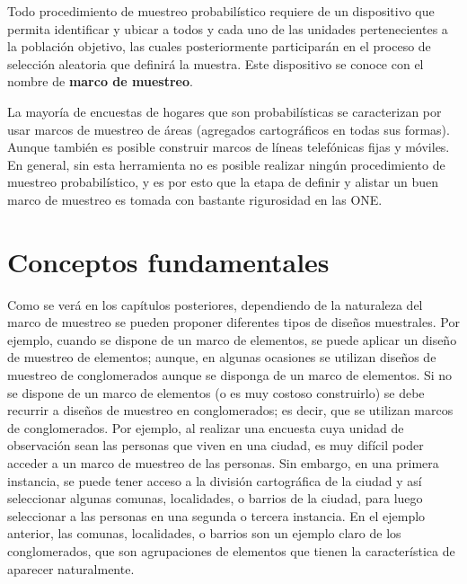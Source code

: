 \documentclass[
  12pt,
  spanish,
]{book}
\begin{document}
Todo procedimiento de muestreo probabilístico requiere de un dispositivo que permita identificar y ubicar a todos y cada uno de las unidades pertenecientes a la población objetivo, las cuales posteriormente participarán en el proceso de selección aleatoria que definirá la muestra. Este dispositivo se conoce con el nombre de \textbf{marco de muestreo}.

La mayoría de encuestas de hogares que son probabilísticas se caracterizan por usar marcos de muestreo de áreas (agregados cartográficos en todas sus formas). Aunque también es posible construir marcos de líneas telefónicas fijas y móviles. En general, sin esta herramienta no es posible realizar ningún procedimiento de muestreo probabilístico, y es por esto que la etapa de definir y alistar un buen marco de muestreo es tomada con bastante rigurosidad en las ONE.

\hypertarget{conceptos-fundamentales}{%
\section{Conceptos fundamentales}\label{conceptos-fundamentales}}

Como se verá en los capítulos posteriores, dependiendo de la naturaleza del marco de muestreo se pueden proponer diferentes tipos de diseños muestrales. Por ejemplo, cuando se dispone de un marco de elementos, se puede aplicar un diseño de muestreo de elementos; aunque, en algunas ocasiones se utilizan diseños de muestreo de conglomerados aunque se disponga de un marco de elementos. Si no se dispone de un marco de elementos (o es muy costoso construirlo) se debe recurrir a diseños de muestreo en conglomerados; es decir, que se utilizan marcos de conglomerados. Por ejemplo, al realizar una encuesta cuya unidad de observación sean las personas que viven en una ciudad, es muy difícil poder acceder a un marco de muestreo de las personas. Sin embargo, en una primera instancia, se puede tener acceso a la división cartográfica de la ciudad y así seleccionar algunas comunas, localidades, o barrios de la ciudad, para luego seleccionar a las personas en una segunda o tercera instancia. En el ejemplo anterior, las comunas, localidades, o barrios son un ejemplo claro de los conglomerados, que son agrupaciones de elementos que tienen la característica de aparecer naturalmente.
\end{document}
